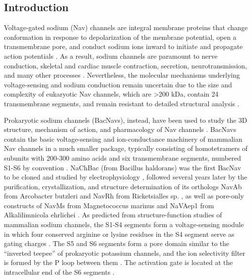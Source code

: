\begin{refsection}
\section{Introduction}

Voltage-gated sodium (Nav) channels are integral membrane proteins that change conformation in response to depolarization of the membrane potential, open a transmembrane pore, and conduct sodium ions inward to initiate and propagate action potentials \cite{Hille:2001tw}. As a result, sodium channels are paramount to nerve conduction, skeletal and cardiac muscle contraction, secretion, neurotransmission, and many other processes \cite{George:2005fm}. Nevertheless, the molecular mechanisms underlying voltage-sensing and sodium conduction remain uncertain due to the size and complexity of eukaryotic Nav channels, which are >200 kDa, contain 24 transmembrane segments, and remain resistant to detailed structural analysis \cite{Catterall:2000vb}.

Prokaryotic sodium channels (BacNavs), instead, have been used to study the 3D structure, mechanism of action, and pharmacology of Nav channels \cite{Ren:2001uo}. BacNavs contain the basic voltage-sensing and ion-conductance machinery of mammalian Nav channels in a much smaller package, typically consisting of homotetramers of subunits with 200-300 amino acids and six transmembrane segments, numbered S1-S6 by convention \cite{Ren:2001uo,Catterall:2015dh,Payandeh:2015hz}. NaChBac (from Bacillus haldorans) was the first BacNav to be cloned and studied by electrophysiology \cite{Ren:2001uo}, followed several years later by the purification, crystallization, and structure determination of its orthologs NavAb from Arcobacter butzleri \cite{Payandeh:2012ib,Payandeh:2013ex} and NavRh from Ricketsialles sp. \cite{Zhang:2013bz}, as well as pore-only constructs of NavMs from Magnetococcus marinus \cite{McCusker:2012di} and NaVAep1 from Alkalilimnicola ehrlichei \cite{Shaya:2014gg}. As predicted from structure-function studies of mammalian sodium channels, the S1-S4 segments form a voltage-sensing module in which four conserved arginine or lysine residues in the S4 segment serve as gating charges \cite{Bezanilla:2000gg,Catterall:2010kr}. The S5 and S6 segments form a pore domain similar to the ``inverted teepee'' of prokaryotic potassium channels, and the ion selectivity filter is formed by the P loop between them \cite{Catterall:2015dh}. The activation gate is located at the intracellular end of the S6 segments \cite{Catterall:2015dh}.


\end{refsection}

